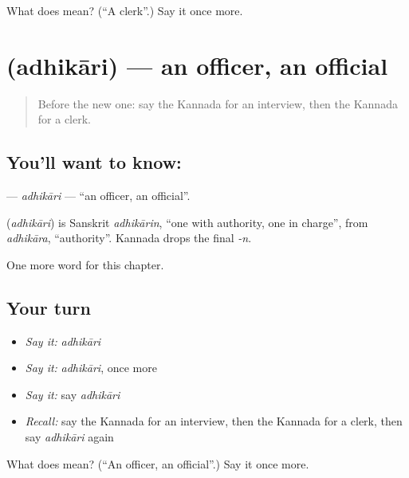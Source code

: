 \begin{tcolorbox}[breakable,colback=teal!4,colframe=teal!35!black,title={Before you move on}]
What does  mean? (\textquotedblleft{}A clerk\textquotedblright{}.) Say it once more.
\end{tcolorbox}
\section[\texorpdfstring{\kn{ಅಧಿಕಾರಿ} (adhikāri)}{ಅಧಿಕಾರಿ (adhikāri)}]{ (adhikāri) — an officer, an official}

\label{lesson:KA-C231-adhikari}



\begin{quote}
Before the new one: say the Kannada for an interview, then the Kannada for a clerk.
\end{quote}

\subsection*{You'll want to know: }
\textbf{} — \emph{adhikāri} — \textquotedblleft{}an officer, an official\textquotedblright{}.

\begin{cousinweb}
\textbf{} (\emph{adhikāri}) is Sanskrit \emph{adhikārin}, \textquotedblleft{}one with authority, one in charge\textquotedblright{}, from \emph{adhikāra}, \textquotedblleft{}authority\textquotedblright{}. Kannada drops the final \emph{-n}.
\end{cousinweb}

\begin{grammarlens}[title={What you've built}]
One more word for this chapter.
\end{grammarlens}

\subsection*{Your turn}
\begin{itemize}
\raggedright
  \item \emph{Say it:} \emph{adhikāri}
  \item \emph{Say it:} \emph{adhikāri}, once more
  \item \emph{Say it:} say \emph{adhikāri}
  \item \emph{Recall:} say the Kannada for an interview, then the Kannada for a clerk, then say \emph{adhikāri} again
\end{itemize}

\begin{tcolorbox}[breakable,colback=teal!4,colframe=teal!35!black,title={Before you move on}]
What does  mean? (\textquotedblleft{}An officer, an official\textquotedblright{}.) Say it once more.
\end{tcolorbox}
